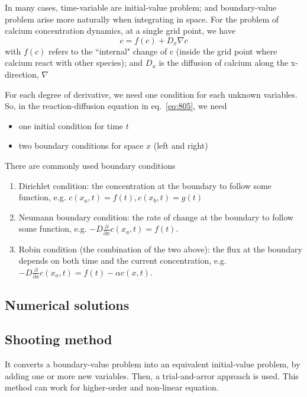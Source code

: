 In many cases, time-variable are initial-value problem; and boundary-value
problem arise more naturally when integrating in space. For the problem of
calcium concentration dynamics, at a single grid point, we have
\begin{equation}
c = f(c) + D_x \nabla c
\end{equation}
with $f(c)$ refers to the ``internal" change of c (inside the grid point where
calcium react with other species); and $D_x$ is the diffusion of calcium along
the x-direction, $\nabla$

For each degree of derivative, we need one condition for each
unknown variables. So, in the reaction-diffusion equation in
eq.~\eqref{eq:805}, we need
\begin{itemize}
\item one initial condition for time $t$
\item two boundary conditions for space $x$ (left and right)
\end{itemize}

There are commonly used boundary conditions
\begin{enumerate}
\item Dirichlet condition: the concentration at the boundary to follow
  some function, e.g. $c(x_a,t)=f(t), c(x_b,t) = g(t)$

\item Neumann boundary condition: the rate of change at the boundary
  to follow some function, e.g.
  $-D\frac{\partial}{\partial x}c(x_a,t)=f(t)$.

\item Robin condition (the combination of the two above): the flux at
  the boundary depends on both time and the current concentration,
  e.g.  $-D\frac{\partial}{\partial x}c(x_a,t)=f(t) - \alpha c(x,t)$.
\end{enumerate}

\subsection{Numerical solutions}
\label{sec:numerical-solutions}

\subsection{Shooting method}
\label{sec:shooting_method}

It converts a boundary-value problem into an equivalent initial-value problem,
by adding one or more new variables. Then, a trial-and-arror approach is used.
This method can work for higher-order and non-linear equation. 

